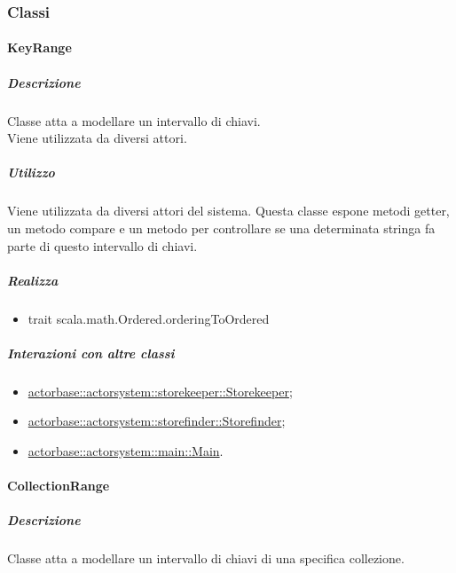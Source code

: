 \documentclass{scalatekids-article}
\begin{document}
\subsubsection{Classi}


\paragraph{KeyRange}
\label{sec:actorbase::actorsystem::utils::KeyRange}

\subparagraph{Descrizione}
Classe atta a modellare un intervallo di chiavi.\\Viene utilizzata da diversi
attori.

\subparagraph{Utilizzo}
Viene utilizzata da diversi attori del sistema. Questa classe espone metodi
getter, un metodo compare e un metodo per controllare se una determinata
stringa fa parte di questo intervallo di chiavi.

\subparagraph{Realizza}
\begin{itemize}
\item trait scala.math.Ordered.orderingToOrdered
\end{itemize}

\subparagraph{Interazioni con altre classi}

\begin{itemize}
\item \hyperref[sec:actorbase::actorsystem::storekeeper::Storekeeper]{actorbase::actorsystem::storekeeper::Storekeeper};
\item \hyperref[sec:actorbase::actorsystem::storefinder::Storefinder]{actorbase::actorsystem::storefinder::Storefinder};
\item \hyperref[sec:actorbase::actorsystem::main::Main]{actorbase::actorsystem::main::Main}.
\end{itemize}


\paragraph{CollectionRange}
\label{sec:actorbase::actorsystem::utils::CollectionRange}

\subparagraph{Descrizione}
Classe atta a modellare un intervallo di chiavi di una specifica collezione.
\end{document}
